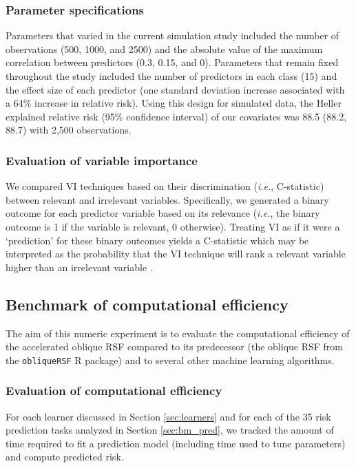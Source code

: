 \documentclass[12pt]{article}\usepackage[]{graphicx}\usepackage[]{xcolor}
\newcommand{\ie}{\textit{i.e.}}
\newcommand{\secref}[1]{Section \ref{#1}}
\begin{document}
\subsubsection{Parameter specifications}




Parameters that varied in the current simulation study included the number of observations (500, 1000, and 2500) and the absolute value of the maximum correlation between predictors (0.3, 0.15, and 0). Parameters that remain fixed throughout the study included the number of predictors in each class (15) and the effect size of each predictor (one standard deviation increase associated with a 64\% increase in relative risk). Using this design for simulated data, the Heller explained relative risk (95\% confidence interval) of our covariates was 88.5 (88.2, 88.7) \citep{heller2012measure} with 2,500 observations.

\subsubsection{Evaluation of variable importance}

We compared VI techniques based on their discrimination (\ie, C-statistic) between relevant and irrelevant variables. Specifically, we generated a binary outcome for each predictor variable based on its relevance (\ie, the binary outcome is 1 if the variable is relevant, 0 otherwise). Treating VI as if it were a ‘prediction’ for these binary outcomes yields a C-statistic which may be interpreted as the probability that the VI technique will rank a relevant variable higher than an irrelevant variable \citep{harrell1982evaluating}.

\subsection{Benchmark of computational efficiency} \label{sec:bm_compute}

The aim of this numeric experiment is to evaluate the computational efficiency of the accelerated oblique RSF compared to its predecessor (the oblique RSF from the \texttt{obliqueRSF} R package) and to several other machine learning algorithms.

\subsubsection{Evaluation of computational efficiency}

For each learner discussed in \secref{sec:learners} and for each of the 35 risk prediction tasks analyzed in \secref{sec:bm_pred}, we tracked the amount of time required to fit a prediction model (including time used to tune parameters) and compute predicted risk.
\end{document}
